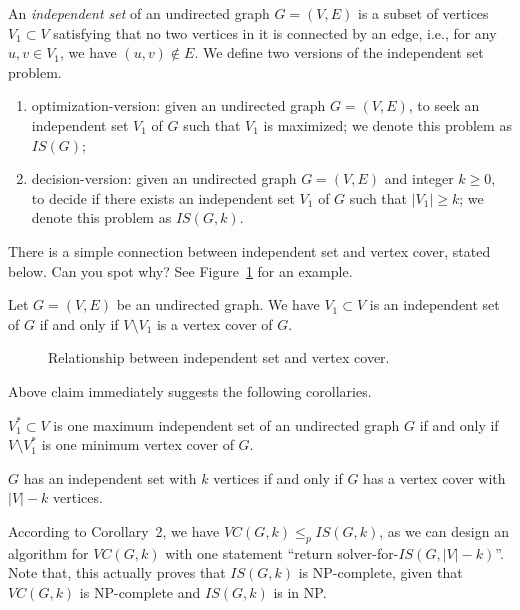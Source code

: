 An \emph{independent set} of an undirected graph $G = (V, E)$
is a subset of vertices $V_1\subset V$ satisfying that no two vertices in it is connected by an edge, i.e.,
for any $u,v\in V_1$, we have $(u,v)\not\in E$. We define two versions of the independent set problem.
\begin{enumerate}
\item optimization-version: given an undirected graph $G = (V, E)$, to seek an independent set $V_1$ of $G$ such that $V_1$ is maximized; we denote this problem as $IS(G)$;
\item decision-version: given an undirected graph $G = (V, E)$ and integer $k\ge 0$, to decide if there exists an independent set $V_1$ of $G$ such that $|V_1| \ge k$;
we denote this problem as $IS(G,k)$.
\end{enumerate}

There is a simple connection between independent set and vertex cover, stated below. Can you spot why?
See Figure~\ref{fig:is} for an example.

\begin{claim}
Let $G = (V, E)$ be an undirected graph. We have $V_1\subset V$ is an independent set of $G$ if and only if $V\setminus V_1$ is a vertex cover of $G$.
\end{claim}

\begin{figure}[!h]
\centering{}
\caption{Relationship between independent set and vertex cover.}
\label{fig:is}
\end{figure}

Above claim immediately suggests the following corollaries.
\begin{corollary}
$V_1^*\subset V$ is one maximum independent set of an undirected graph $G$ if and only if $V\setminus V_1^*$ is one minimum vertex cover of $G$.
\end{corollary}
\begin{corollary}
$G$ has an independent set with $k$ vertices if and only if $G$ has a vertex cover with $|V|-k$ vertices.
\end{corollary}

According to Corollary~2, we have $VC(G, k) \le_p IS(G, k)$, as we can design an algorithm for $VC(G,k)$ with one statement ``return solver-for-$IS(G,|V|-k)$''.
Note that, this actually proves that $IS(G,k)$ is NP-complete, given that $VC(G,k)$ is NP-complete and $IS(G,k)$ is in NP.

